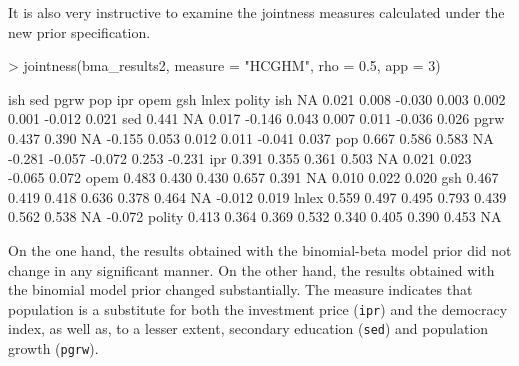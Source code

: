 \documentclass[a4paper]{article}
\begin{document}
It is also very instructive to examine the jointness measures calculated under the new prior specification.
\begin{Schunk}
\begin{Sinput}
> jointness(bma_results2, measure = "HCGHM", rho = 0.5, app = 3)
\end{Sinput}
\begin{Soutput}
         ish   sed  pgrw    pop    ipr   opem    gsh  lnlex polity
ish       NA 0.021 0.008 -0.030  0.003  0.002  0.001 -0.012  0.021
sed    0.441    NA 0.017 -0.146  0.043  0.007  0.011 -0.036  0.026
pgrw   0.437 0.390    NA -0.155  0.053  0.012  0.011 -0.041  0.037
pop    0.667 0.586 0.583     NA -0.281 -0.057 -0.072  0.253 -0.231
ipr    0.391 0.355 0.361  0.503     NA  0.021  0.023 -0.065  0.072
opem   0.483 0.430 0.430  0.657  0.391     NA  0.010  0.022  0.020
gsh    0.467 0.419 0.418  0.636  0.378  0.464     NA -0.012  0.019
lnlex  0.559 0.497 0.495  0.793  0.439  0.562  0.538     NA -0.072
polity 0.413 0.364 0.369  0.532  0.340  0.405  0.390  0.453     NA
\end{Soutput}
\end{Schunk}
On the one hand, the results obtained with the binomial-beta model prior did not change in any significant manner.
On the other hand, the results obtained with the binomial model prior changed substantially.
The measure indicates that population is a substitute for both the investment price (\verb+ipr+) and the democracy index, as well as, to a lesser extent, secondary education (\verb+sed+) and population growth (\verb+pgrw+).
\end{document}
